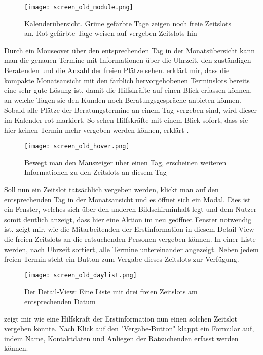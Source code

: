 \begin{figure}[H]
    \caption{Kalenderübersicht. Grüne gefärbte Tage zeigen noch freie Zeitslots an. Rot gefärbte Tage weisen auf vergeben Zeitslots hin}
    \centering
    \texttt{[image: screen\_old\_module.png]}
\end{figure}

Durch ein Mouseover über den entsprechenden Tag in der Monatsübersicht kann man
die genauen Termine mit Informationen über die Uhrzeit, den zuständigen
Beratenden und die Anzahl der freien Plätze sehen. \ipName erklärt mir, dass
die kompakte Monatsansicht mit den farblich hervorgehobenen Terminslots bereits
eine sehr gute Lösung ist, damit die Hilfskräfte auf einen Blick erfassen
können, an welche Tagen sie den Kunden noch Beratungsgespräche anbieten können.
Sobald alle Plätze der Beratungstermine an einem Tag vergeben sind, wird dieser
im Kalender rot markiert. \glqq So sehen Hilfskräfte mit einem Blick sofort,
dass sie hier keinen Termin mehr vergeben werden können\grqq, erklärt \ipName
\cite{claves}.

\begin{figure}[H]
    \caption{Bewegt man den Mauszeiger über einen Tag, erscheinen weiteren Informationen zu den Zeitslots an diesem Tag}
    \centering
    \texttt{[image: screen\_old\_hover.png]}
\end{figure}

Soll nun ein Zeitslot tatsächlich vergeben werden, klickt man auf den
entsprechenden Tag in der Monatsansicht und es öffnet sich ein Modal. Dies ist
ein Fenster, welches sich über den anderen Bildschirminhalt legt und dem Nutzer
somit deutlich anzeigt, dass hier eine Aktion im neu geöffnet Fenster notwendig
ist. \ipName zeigt mir, wie die Mitarbeitenden der Erstinformation in diesem
Detail-View die freien Zeitslots an die ratsuchenden Personen vergeben können.
In einer Liste werden, nach Uhrzeit sortiert, alle Termine untereinander
angezeigt. Neben jedem freien Termin steht ein Button zum Vergabe dieses
Zeitslots zur Verfügung.

\begin{figure}[H]
    \caption{Der Detail-View: Eine Liste mit drei freien Zeitslots am entsprechenden Datum}
    \centering
    \texttt{[image: screen\_old\_daylist.png]}
\end{figure}

\ipName zeigt mir wie eine Hilfskraft der Erstinformation nun einen solchen
Zeitslot vergeben könnte. Nach Klick auf den "Vergabe-Button" klappt ein
Formular auf, indem Name, Kontaktdaten und Anliegen der Ratsuchenden erfasst
werden können.

